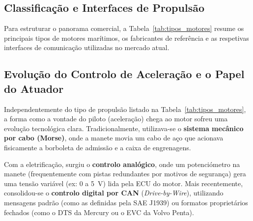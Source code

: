 \subsection{Classificação e Interfaces de Propulsão}
Para estruturar o panorama comercial, a Tabela~\ref{tab:tipos_motores} resume os principais tipos de motores marítimos, os fabricantes de referência e as respetivas interfaces de comunicação utilizadas no mercado atual.

\begin{table}[htpb]
\centering
\caption{Tipos de motores marítimos e interfaces de rede típicas.}
\label{tab:tipos_motores}
\end{table}

\subsection{Evolução do Controlo de Aceleração e o Papel do Atuador}
Independentemente do tipo de propulsão listado na Tabela~\ref{tab:tipos_motores}, a forma como a vontade do piloto (aceleração) chega ao motor sofreu uma evolução tecnológica clara. Tradicionalmente, utilizava-se o \textbf{sistema mecânico por cabo (Morse)}, onde a manete movia um cabo de aço que acionava fisicamente a borboleta de admissão e a caixa de engrenagens.

Com a eletrificação, surgiu o \textbf{controlo analógico}, onde um potenciómetro na manete (frequentemente com pistas redundantes por motivos de segurança) gera uma tensão variável (ex: 0 a 5~V) lida pela ECU do motor. Mais recentemente, consolidou-se o \textbf{controlo digital por CAN} (\textit{Drive-by-Wire}), utilizando mensagens padrão (como as definidas pela SAE J1939) ou formatos proprietários fechados (como o DTS da Mercury ou o EVC da Volvo Penta).

